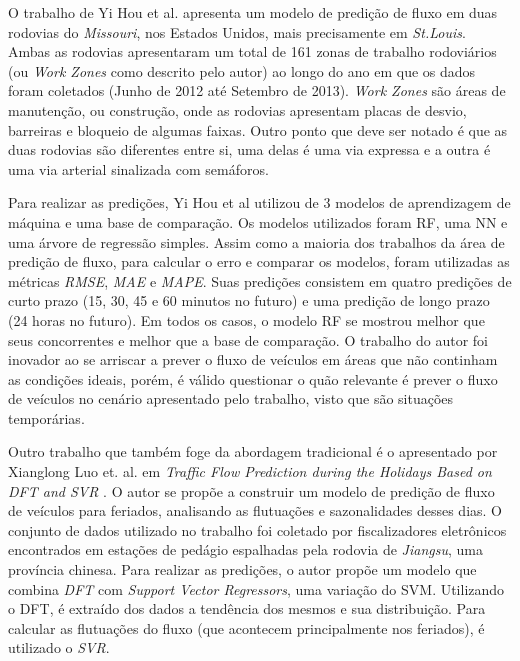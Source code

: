 O trabalho de Yi Hou et al. apresenta um modelo de predição de fluxo em duas rodovias do \textit{Missouri}, nos Estados Unidos, mais precisamente em \textit{St.Louis}. Ambas as rodovias apresentaram um total de 161 zonas de trabalho rodoviários (ou \textit{Work Zones} como descrito pelo autor) ao longo do ano em que os dados foram coletados (Junho de 2012 até Setembro de 2013). \textit{Work Zones} são áreas de manutenção, ou construção, onde as rodovias apresentam placas de desvio, barreiras e bloqueio de algumas faixas. Outro ponto que deve ser notado é que as duas rodovias são diferentes entre si, uma delas é uma via expressa e a outra é uma via arterial sinalizada com semáforos.

Para realizar as predições, Yi Hou et al utilizou de 3 modelos de aprendizagem de máquina e uma base de comparação. Os modelos utilizados foram \acrfull{RF}, uma \acrfull{NN} e uma árvore de regressão simples. Assim como a maioria dos trabalhos da área de predição de fluxo, para calcular o erro e comparar os modelos, foram utilizadas as métricas \textit{RMSE}, \textit{MAE} e \textit{MAPE}. Suas predições consistem em quatro predições de curto prazo (15, 30, 45 e 60 minutos no futuro) e uma predição de longo prazo (24 horas no futuro). Em todos os casos, o modelo \acrshort{RF} se mostrou melhor que seus concorrentes e melhor que a base de comparação. O trabalho do autor foi inovador ao se arriscar a prever o fluxo de veículos em áreas que não continham as condições ideais, porém, é válido questionar o quão relevante é prever o fluxo de veículos no cenário apresentado pelo trabalho, visto que são situações temporárias.


Outro trabalho que também foge da abordagem tradicional é o apresentado por Xianglong Luo et. al. em \textit{Traffic Flow Prediction during the Holidays Based on DFT and SVR} \cite{luo2019traffic}. O autor se propõe a construir um modelo de predição de fluxo de veículos para feriados, analisando as flutuações e sazonalidades desses dias. O conjunto de dados utilizado no trabalho foi coletado por fiscalizadores eletrônicos encontrados em estações de pedágio espalhadas pela rodovia de \textit{Jiangsu}, uma província chinesa. Para realizar as predições, o autor propõe um modelo que combina \textit{\acrfull{DFT}} com \textit{Support Vector Regressors}, uma variação do \acrshort{SVM}. Utilizando o \acrshort{DFT}, é extraído dos dados a tendência dos mesmos e sua distribuição. Para calcular as flutuações do fluxo (que acontecem principalmente nos feriados), é utilizado o \textit{SVR}.

